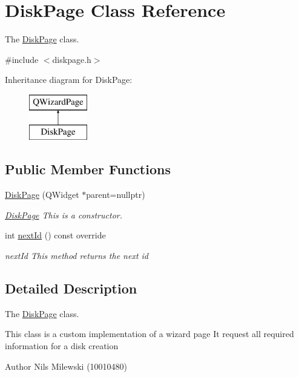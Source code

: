 \hypertarget{class_disk_page}{}\section{Disk\+Page Class Reference}
\label{class_disk_page}


The \mbox{\hyperlink{class_disk_page}{Disk\+Page}} class.  




{\ttfamily \#include $<$diskpage.\+h$>$}

Inheritance diagram for Disk\+Page\+:\begin{figure}[H]
\begin{center}
\leavevmode
\includegraphics[height=2.000000cm]{class_disk_page}
\end{center}
\end{figure}
\subsection*{Public Member Functions}
\begin{DoxyCompactItemize}
\item 
\mbox{\hyperlink{class_disk_page_a7962a9459e0cb49c1f587de2d595cc04}{Disk\+Page}} (Q\+Widget $\ast$parent=nullptr)
\begin{DoxyCompactList}\small\item\em \mbox{\hyperlink{class_disk_page}{Disk\+Page}} This is a constructor. \end{DoxyCompactList}\item 
int \mbox{\hyperlink{class_disk_page_ac6cb9ab53d89deac235d43251b333354}{next\+Id}} () const override
\begin{DoxyCompactList}\small\item\em next\+Id This method returns the next id \end{DoxyCompactList}\end{DoxyCompactItemize}


\subsection{Detailed Description}
The \mbox{\hyperlink{class_disk_page}{Disk\+Page}} class. 

This class is a custom implementation of a wizard page It request all required information for a disk creation \begin{DoxyAuthor}{Author}
Nils Milewski (10010480) 
\end{DoxyAuthor}


